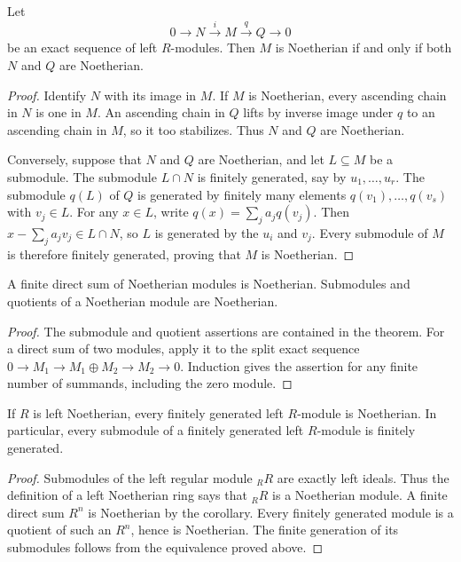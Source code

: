 \begin{theorem}\label{thm-noetherian-exact-sequences}
Let
\[
0\longrightarrow N\xrightarrow{i}M\xrightarrow{q}Q\longrightarrow0
\]
be an exact sequence of left $R$-modules. Then $M$ is Noetherian if and only if both $N$ and $Q$ are Noetherian.
\end{theorem}
\begin{proof}\label{proof-noetherian-exact-sequences}
Identify $N$ with its image in $M$. If $M$ is Noetherian, every ascending chain in $N$ is one in $M$. An ascending chain in $Q$ lifts by inverse image under $q$ to an ascending chain in $M$, so it too stabilizes. Thus $N$ and $Q$ are Noetherian.

Conversely, suppose that $N$ and $Q$ are Noetherian, and let $L\subseteq M$ be a submodule. The submodule $L\cap N$ is finitely generated, say by $u_1,\ldots,u_r$. The submodule $q(L)$ of $Q$ is generated by finitely many elements $q(v_1),\ldots,q(v_s)$ with $v_j\in L$. For any $x\in L$, write $q(x)=\sum_ja_jq(v_j)$. Then $x-\sum_ja_jv_j\in L\cap N$, so $L$ is generated by the $u_i$ and $v_j$. Every submodule of $M$ is therefore finitely generated, proving that $M$ is Noetherian.
\end{proof}

\begin{corollary}\label{cor-finite-sums-noetherian}
A finite direct sum of Noetherian modules is Noetherian. Submodules and quotients of a Noetherian module are Noetherian.
\end{corollary}
\begin{proof}\label{proof-finite-sums-noetherian}
The submodule and quotient assertions are contained in the theorem. For a direct sum of two modules, apply it to the split exact sequence $0\to M_1\to M_1\oplus M_2\to M_2\to0$. Induction gives the assertion for any finite number of summands, including the zero module.
\end{proof}

\begin{theorem}\label{thm-finite-modules-noetherian-ring}
If $R$ is left Noetherian, every finitely generated left $R$-module is Noetherian. In particular, every submodule of a finitely generated left $R$-module is finitely generated.
\end{theorem}
\begin{proof}\label{proof-finite-modules-noetherian-ring}
Submodules of the left regular module ${}_RR$ are exactly left ideals. Thus the definition of a left Noetherian ring says that ${}_RR$ is a Noetherian module. A finite direct sum $R^n$ is Noetherian by the corollary. Every finitely generated module is a quotient of such an $R^n$, hence is Noetherian. The finite generation of its submodules follows from the equivalence proved above.
\end{proof}

